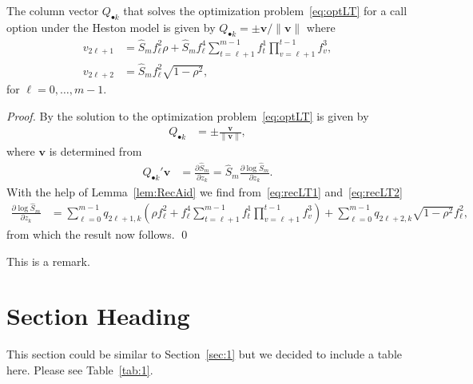 \documentclass[graybox,footinfo]{svmult}
\newcommand{\bsv}{\boldsymbol{v}}    %
\begin{document}
\begin{proposition}\label{prop:optvLTc}
 The column vector $Q_{\bullet k}$ that solves the optimization problem~\eqref{eq:optLT} for a call option under the Heston model is given by $Q_{\bullet k} = \pm \bsv / \|\bsv\|$ where
\begin{align*}
  v_{2\ell+1} &= \hat{S}_m f^2_{\ell} \rho + \hat{S}_m f^4_{\ell} \sum_{t=\ell+1}^{m-1}f^1_t\prod_{v=\ell+1}^{t-1}f^3_v
  ,
  \\
   v_{2\ell+2} &= \hat{S}_m f^2_{\ell} \sqrt{1-\rho^2},
\end{align*}
for $\ell=0,\ldots,m-1$.
\end{proposition}
\begin{proof}
  By \cite[Theorem 1]{IT2006} the solution to the optimization problem~\eqref{eq:optLT} is given by
  \begin{align*}
   Q_{\bullet k}
   &=
   \pm \frac{\bsv}{\| \bsv \|}
   ,
  \end{align*}
  where $\bsv$ is determined from
  \begin{align*}
    Q_{\bullet k}' \bsv
    &=
    \frac{\partial \hat{S}_m}{\partial z_k}
    =
    \hat{S}_m \frac{\partial \log \hat{S}_m}{\partial z_k}
    .
  \end{align*}
  With the help of Lemma~\ref{lem:RecAid} we find from~\eqref{eq:recLT1} and~\eqref{eq:recLT2}
  \begin{align*}
    \frac{\partial \log \hat{S}_m}{\partial z_k}
    &=
    \sum_{\ell=0}^{m-1} q_{2\ell+1,k} \left( \rho f^2_{\ell} + f^4_{\ell} \sum_{t=\ell+1}^{m-1} f^1_t \prod_{v=\ell+1}^{t-1} f^3_v \right)
    +
    \sum_{\ell=0}^{m-1} q_{2\ell+2,k} \sqrt{1-\rho^2} f^2_{\ell}
    ,
  \end{align*}
  from which the result now follows.
  \qed
\end{proof}

\begin{remark}
    This is a remark.
\end{remark}

\section{Section Heading}
\label{sec:2}

This section could be similar to Section~\ref{sec:1} but we decided to include a table here.
Please see Table~\ref{tab:1}.
\end{document}
